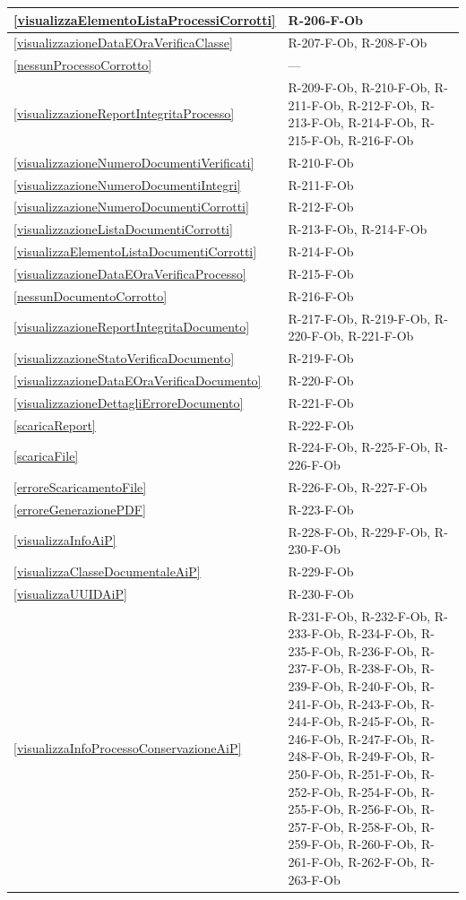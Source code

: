 \begin{longtable}{|p{4cm}|p{10cm}|}
\hline
\ref{visualizzaElementoListaProcessiCorrotti} & R-206-F-Ob \\
\hline
\ref{visualizzazioneDataEOraVerificaClasse} & R-207-F-Ob, R-208-F-Ob \\
\hline
\ref{nessunProcessoCorrotto} & --- \\
\hline
\ref{visualizzazioneReportIntegritaProcesso} & R-209-F-Ob, R-210-F-Ob, R-211-F-Ob, R-212-F-Ob, R-213-F-Ob, R-214-F-Ob, R-215-F-Ob, R-216-F-Ob \\
\hline
\ref{visualizzazioneNumeroDocumentiVerificati} & R-210-F-Ob \\
\hline
\ref{visualizzazioneNumeroDocumentiIntegri} & R-211-F-Ob \\
\hline
\ref{visualizzazioneNumeroDocumentiCorrotti} & R-212-F-Ob \\
\hline
\ref{visualizzazioneListaDocumentiCorrotti} & R-213-F-Ob, R-214-F-Ob \\
\hline
\ref{visualizzaElementoListaDocumentiCorrotti} & R-214-F-Ob \\
\hline
\ref{visualizzazioneDataEOraVerificaProcesso} & R-215-F-Ob \\
\hline
\ref{nessunDocumentoCorrotto} & R-216-F-Ob \\
\hline
\ref{visualizzazioneReportIntegritaDocumento} & R-217-F-Ob, R-219-F-Ob, R-220-F-Ob, R-221-F-Ob \\
\hline
\ref{visualizzazioneStatoVerificaDocumento} & R-219-F-Ob \\
\hline
\ref{visualizzazioneDataEOraVerificaDocumento} & R-220-F-Ob \\
\hline
\ref{visualizzazioneDettagliErroreDocumento} & R-221-F-Ob \\
\hline
\ref{scaricaReport} & R-222-F-Ob \\
\hline
\ref{scaricaFile} & R-224-F-Ob, R-225-F-Ob, R-226-F-Ob \\
\hline
\ref{erroreScaricamentoFile} & R-226-F-Ob, R-227-F-Ob \\
\hline
\ref{erroreGenerazionePDF} & R-223-F-Ob \\
\hline
\ref{visualizzaInfoAiP} & R-228-F-Ob, R-229-F-Ob, R-230-F-Ob \\
\hline
\ref{visualizzaClasseDocumentaleAiP} & R-229-F-Ob \\
\hline
\ref{visualizzaUUIDAiP} & R-230-F-Ob \\
\hline
\ref{visualizzaInfoProcessoConservazioneAiP} & R-231-F-Ob, R-232-F-Ob, R-233-F-Ob, R-234-F-Ob, R-235-F-Ob, R-236-F-Ob, R-237-F-Ob, R-238-F-Ob, R-239-F-Ob, R-240-F-Ob, R-241-F-Ob, R-243-F-Ob, R-244-F-Ob, R-245-F-Ob, R-246-F-Ob, R-247-F-Ob, R-248-F-Ob, R-249-F-Ob, R-250-F-Ob, R-251-F-Ob, R-252-F-Ob, R-254-F-Ob, R-255-F-Ob, R-256-F-Ob, R-257-F-Ob, R-258-F-Ob, R-259-F-Ob, R-260-F-Ob, R-261-F-Ob, R-262-F-Ob, R-263-F-Ob \\

\end{longtable}
